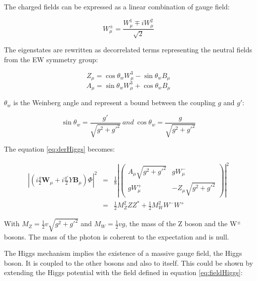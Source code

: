     The charged fields can be expressed as a linear combination of gauge field:

    \begin{equation}
      W^{\pm}_{\mu} = \frac{W^1_{\mu} \mp iW^2_{\mu}}{\sqrt{2}}
    \end{equation}

    The eigenstates are rewritten as decorrelated terms representing the neutral fields from the EW symmetry group:

    \begin{equation}
      Z_{\mu} = \cos{\theta_{w}W^3_{\mu}} - \sin{\theta_{w}B_{\mu}}
    \end{equation}
    \begin{equation}
      A_{\mu} = \sin{\theta_{w}W^3_{\mu}} + \cos{\theta_{w}B_{\mu}}
    \end{equation}

   $\theta_{w}$ is the Weinberg angle and represent a bound between the coupling $g$ and $g'$:
   
   \begin{equation}
   \sin{\theta_{w}} = \frac{g'}{\sqrt{g^2+g'^2}} \ and \ \cos{\theta_{w}} = \frac{g}{\sqrt{g^2+g'^2}}
   \end{equation} 

    The equation \ref{eq:derHiggs} becomes:

    \begin{equation}
      \begin{array}{rcl}
     \left|\left(i\frac{g}{2}\textbf{W}_{\mu} +i\frac{g'}{2}Y\textbf{B}_{\mu}\right) \Phi \right|^2 & = & \frac{1}{8} \left| 
        \begin{pmatrix}
          A_{\mu}\sqrt{g^2 + g'^2} & gW^-_{\mu} \\
          gW^+_{\mu} & -Z_{\mu}\sqrt{g^2 + g'^2}
        \end{pmatrix}
     \right|^2 \\
      & = & \frac{1}{2}M^2_Z ZZ^* + \frac{1}{2}M^2_W W^-W^+
      \end{array}
    \end{equation}

    With $M_Z = \frac{1}{2}v\sqrt{g^2 + g'^2}$ and $M_W = \frac{1}{2} vg$, the mass of the Z boson and the W$^{\pm}$ bosons. 
    The mass of the photon is coherent to the expectation and is null. 

    The Higgs mechanism implies the existence of a massive gauge field, the Higgs boson.
    It is coupled to the other bosons and also to itself.
    This could be shown by extending the Higgs potential with the field defined in equation \ref{eq:fieldHiggs}:

